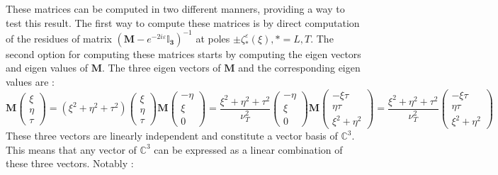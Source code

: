 These matrices can be computed in two different manners, providing a way to test this result. The first way to compute these matrices is by direct computation of the residues of matrix $(\mathbf{M}-e^{-2i\varepsilon}\mathbf{\mathbb{I}_3})^{-1}$ at poles $\pm \zeta^{\varepsilon}_*(\xi), *=L,T$. The second option for computing these matrices starts by computing the eigen vectors and eigen values of $\mathbf{M}$. The three eigen vectors of $\mathbf{M}$ and the corresponding eigen values are :
\begin{subequations}
\begin{equation}
    \mathbf{M}\begin{pmatrix}
    \xi \\ \eta \\ \tau 
    \end{pmatrix}
    =(\xi^2+\eta^2+\tau^2)\begin{pmatrix}
    \xi \\ \eta \\ \tau 
    \end{pmatrix}
\end{equation}
\begin{equation}
   \mathbf{M}\begin{pmatrix}
    -\eta \\ \xi \\ 0
    \end{pmatrix}
    =\frac{\xi^2+\eta^2+\tau^2}{\nu_T^2}\begin{pmatrix}
    -\eta \\ \xi \\ 0
    \end{pmatrix} 
\end{equation}
\begin{equation}
   \mathbf{M}\begin{pmatrix}
    -\xi\tau \\ \eta\tau \\ \xi^2+\eta^2
    \end{pmatrix}
    =\frac{\xi^2+\eta^2+\tau^2}{\nu_T^2}\begin{pmatrix}
    -\xi\tau \\ \eta\tau \\ \xi^2+\eta^2
    \end{pmatrix} 
\end{equation}
\end{subequations}
These three vectors are linearly independent and constitute a vector basis of $\mathbb{C}^3$. This means that any vector of $\mathbb{C}^3$ can be expressed as a linear combination of these three vectors. Notably :
